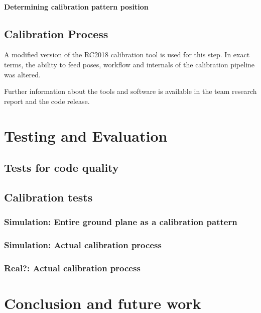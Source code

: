 \documentclass[english, printversion, nomenclature, notitle]{tuvisionthesis} %
\begin{document}
\subsubsection{Determining calibration pattern position}

\section{Calibration Process}
A modified version of the RC2018 calibration tool is used for this step. In exact terms, the ability to feed poses, workflow and internals of the calibration pipeline was altered.

Further information about the tools and software is available in the team research report and the code release. 

\chapter{Testing and Evaluation}
\section{Tests for code quality}
\section{Calibration tests}
\subsection{Simulation: Entire ground plane as a calibration pattern}
\subsection{Simulation: Actual calibration process}
\subsection{Real?: Actual calibration process}

\chapter{Conclusion and future work}
\end{document}
